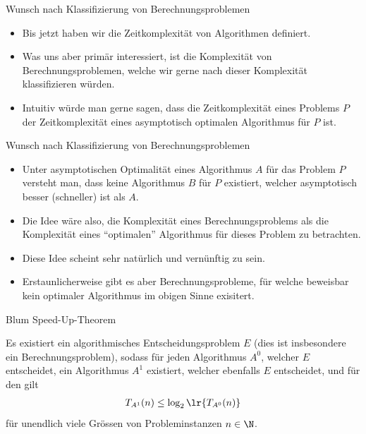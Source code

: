 \begin{frame}{Wunsch nach Klassifizierung von Berechnungsproblemen}
	\begin{itemize}[<+->]
		\item Bis jetzt haben wir die Zeitkomplexität von Algorithmen definiert.
		\item Was uns aber primär interessiert, ist die Komplexität von Berechnungsproblemen, welche wir gerne nach dieser Komplexität klassifizieren würden.
		\item Intuitiv würde man gerne sagen, dass die Zeitkomplexität eines Problems $P$ der Zeitkomplexität eines asymptotisch optimalen Algorithmus für $P$ ist.
	\end{itemize}
\end{frame}


\begin{frame}{Wunsch nach Klassifizierung von Berechnungsproblemen}
	\begin{itemize}[<+->]
		\item Unter asymptotischen Optimalität eines Algorithmus $A$ für das Problem $P$ versteht man, dass keine Algorithmus $B$ für $P$ existiert, welcher asymptotisch besser (schneller) ist als $A$.
		\item Die Idee wäre also, die Komplexität eines Berechnungsproblems als die Komplexität eines \enquote{optimalen} Algorithmus für dieses Problem zu betrachten.
		\item Diese Idee scheint sehr natürlich und vernünftig zu sein.
		\item Erstaunlicherweise gibt es aber Berechnungsprobleme, für welche beweisbar kein optimaler Algorithmus im obigen Sinne exisitert.
	\end{itemize}
\end{frame}

\begin{frame}{Blum Speed-Up-Theorem}
\begin{mytheorem}\label{mytheorem:blum}
Es existiert ein algorithmisches Entscheidungsproblem $E$ (dies ist insbesondere ein Berechnungsproblem), sodass für jeden Algorithmus $A^{0}$, welcher $E$ entscheidet, ein Algorithmus $A^{1}$ existiert, welcher ebenfalls $E$ entscheidet, und für den gilt
\begin{align*}
	T_{A^{1}}(n) \leq \log_2\lr{T_{A^{0}}(n)}
\end{align*}
für unendlich viele Grössen von Probleminstanzen $n\in\N$.
\end{mytheorem}
\end{frame}

